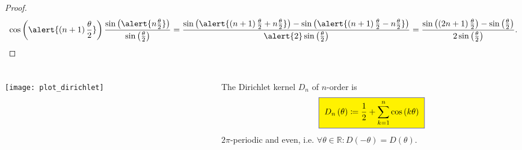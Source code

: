 \begin{frame}
\begin{proof}
		\begin{equation*}
			\cos\left(\alert{\left(n+1\right)\frac{\theta}{2}}\right)
			\frac{
				\sin\left(\alert{n\frac{\theta}{2}}\right)
			}{
				\sin\left(\frac{\theta}{2}\right)
			}=
			\frac{
				\sin\left(
				\alert{\left(n+1\right)\frac{\theta}{2}+n\frac{\theta}{2}}
				\right)-
				\sin\left(
				\alert{\left(n+1\right)\frac{\theta}{2}-n\frac{\theta}{2}}
				\right)
			}{
				\alert{2}\sin\left(\frac{\theta}{2}\right)
			}=
			\frac{
				\sin\left(
				\left(2n+1\right)\frac{\theta}{2}
				\right)-
				\sin\left(\frac{\theta}{2}\right)}{
				2\sin\left(\frac{\theta}{2}\right)
			}.
		\end{equation*}
	\end{proof}
\end{frame}

\begin{frame}
	\frametitle{\secname}

	\begin{columns}
		\begin{column}{0.42\textwidth}
			\texttt{[image: plot\_dirichlet]}
		\end{column}
		\begin{column}{0.54\textwidth}
			\begin{definition}
				The \alert{Dirichlet kernel} $D_{n}$ of $n$-order is
				\begin{equation*}
					\fcolorbox{DarkBlue}{yellow}{
						\begin{math}
							\displaystyle
							D_{n}\left(\theta\right)\coloneqq
							\frac{1}{2}+
							\sum\limits_{k=1}^{n}\cos\left(k\theta\right)
						\end{math}
					}
				\end{equation*}
				$2\pi$-periodic and even, i.e.
				\begin{math}
					\forall\theta\in\mathds{R}:
					D\left(-\theta\right)=D\left(\theta\right)
				\end{math}.
			\end{definition}
		\end{column}
	\end{columns}


\end{frame}
